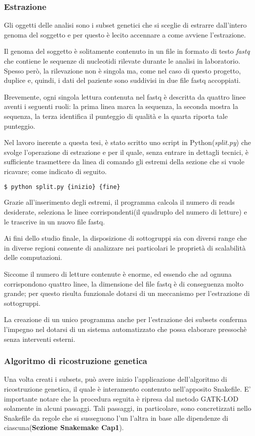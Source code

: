 \subsubsection{Estrazione}
Gli oggetti delle analisi sono i subset genetici che si sceglie di estrarre dall'intero genoma del soggetto e per questo è lecito accennare a come avviene l'estrazione.

Il genoma del soggetto è solitamente contenuto in un file in formato di testo \textit{fastq} che contiene le sequenze di nucleotidi rilevate durante le analisi in laboratorio.
Spesso però, la rilevazione non è singola ma, come nel caso di questo progetto, duplice e, quindi, i dati del paziente sono suddivisi in due file fastq accoppiati.

Brevemente, ogni singola lettura contenuta nel fastq è descritta da quattro linee aventi i seguenti ruoli: la prima linea marca la sequenza, la seconda mostra la sequenza, la terza identifica il punteggio di qualità e la quarta riporta tale punteggio.


Nel lavoro inerente a questa tesi, è stato scritto uno script in Python(\textit{split.py}) che svolge l'operazione di estrazione e per il quale, senza entrare in dettagli tecnici, è sufficiente trasmettere da linea di comando gli estremi della sezione che si vuole ricavare; come indicato di seguito.
\begin{lstlisting}[language=Python]
$ python split.py {inizio} {fine}
\end{lstlisting}
Grazie all'inserimento degli estremi, il programma calcola il numero di reads desiderate, seleziona le linee corrispondenti(il quadruplo del numero di letture) e le trascrive in un nuovo file fastq.

Ai fini dello studio finale, la disposizione di sottogruppi sia con diversi range che in diverse regioni consente di analizzare nei particolari le proprietà di scalabilità delle computazioni.

Siccome il numero di letture contenute è enorme, ed essendo che ad ognuna corrispondono quattro linee, la dimensione del file fastq è di conseguenza molto grande; per questo risulta funzionale dotarsi di un meccanismo per l'estrazione di sottogruppi.

La creazione di un unico programma anche per l'estrazione dei subsets conferma l'impegno nel dotarsi di un sistema automatizzato che possa elaborare pressochè senza interventi esterni.


\subsubsection{Algoritmo di ricostruzione genetica}
Una volta creati i subsets, può avere inizio l'applicazione dell'algoritmo di ricostruzione genetica, il quale è interamento contenuto nell'apposito Snakefile.
E' importante notare che la procedura seguita è ripresa dal metodo GATK-LOD solamente in alcuni passaggi.
Tali passaggi, in particolare, sono concretizzati nello Snakefile da regole che si susseguono l'un l'altra in base alle dipendenze di ciascuna(\textbf{Sezione Snakemake Cap1}).

